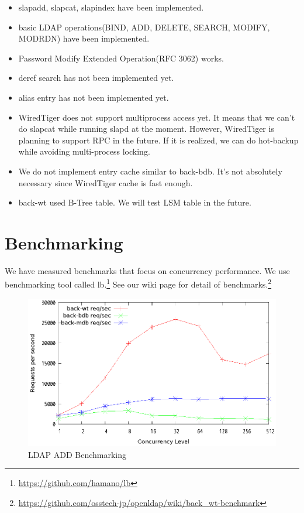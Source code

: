 \documentclass[a4paper,twocolumn,11pt]{article}
\providecommand{\tightlist}{%
      \setlength{\itemsep}{0pt}\setlength{\parskip}{0pt}}
\begin{document}
\begin{itemize}
\tightlist
\item
  slapadd, slapcat, slapindex have been implemented.
\item
  basic LDAP operations(BIND, ADD, DELETE, SEARCH, MODIFY, MODRDN) have
  been implemented.
\item
  Password Modify Extended Operation(RFC 3062) works.
\item
  deref search has not been implemented yet.
\item
  alias entry has not been implemented yet.
\item
  WiredTiger does not support multiprocess access yet. It means that we
  can't do slapcat while running slapd at the moment. However,
  WiredTiger is planning to support RPC in the future. If it is
  realized, we can do hot-backup while avoiding multi-process locking.
\item
  We do not implement entry cache similar to back-bdb. It's not
  absolutely necessary since WiredTiger cache is fast enough.
\item
  back-wt used B-Tree table. We will test LSM table in the future.
\end{itemize}

\section{Benchmarking}\label{benchmarking}

We have measured benchmarks that focus on concurrency performance. We
use benchmarking tool called lb.\footnote{\url{https://github.com/hamano/lb}}
See our wiki page for detail of benchmarks.\footnote{\url{https://github.com/osstech-jp/openldap/wiki/back_wt-benchmark}}

\begin{figure}[H]
\centering
\includegraphics[width=0.9\columnwidth]{benchmark/add_nosync.eps}
\caption{LDAP ADD Benchmarking}
\end{figure}
\end{document}
